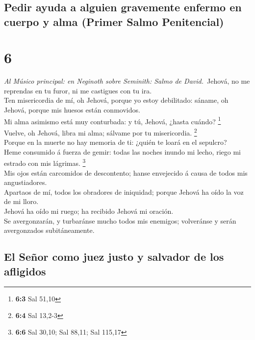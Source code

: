 \hypertarget{pedir-ayuda-a-alguien-gravemente-enfermo-en-cuerpo-y-alma-primer-salmo-penitencial}{%
\subsection{Pedir ayuda a alguien gravemente enfermo en cuerpo y alma
(Primer Salmo
Penitencial)}\label{pedir-ayuda-a-alguien-gravemente-enfermo-en-cuerpo-y-alma-primer-salmo-penitencial}}

\hypertarget{section-5}{%
\section{6}\label{section-5}}

 \emph{Al Músico principal: en Neginoth sobre Seminith:
Salmo de David.}~Jehová, no me reprendas en tu furor, ni me castigues
con tu ira.\\
 Ten misericordia de mí, oh Jehová, porque yo estoy
debilitado: sáname, oh Jehová, porque mis huesos están conmovidos.\\
 Mi alma asimismo está muy conturbada: y tú, Jehová, ¿hasta
cuándo? \footnote{\textbf{6:3} Sal 51,10}\\
 Vuelve, oh Jehová, libra mi alma; sálvame por tu
misericordia. \footnote{\textbf{6:4} Sal 13,2-3}\\
 Porque en la muerte no hay memoria de ti: ¿quién te loará
en el sepulcro?\\
 Heme consumido á fuerza de gemir: todas las noches inundo
mi lecho, riego mi estrado con mis lágrimas. \footnote{\textbf{6:6} Sal
  30,10; Sal 88,11; Sal 115,17}\\
 Mis ojos están carcomidos de descontento; hanse envejecido
á causa de todos mis angustiadores.\\
 Apartaos de mí, todos los obradores de iniquidad; porque
Jehová ha oído la voz de mi lloro.\\
 Jehová ha oído mi ruego; ha recibido Jehová mi oración.\\
 Se avergonzarán, y turbaránse mucho todos mis enemigos;
volveránse y serán avergonzados subitáneamente.

\hypertarget{el-seuxf1or-como-juez-justo-y-salvador-de-los-afligidos}{%
\subsection{El Señor como juez justo y salvador de los
afligidos}\label{el-seuxf1or-como-juez-justo-y-salvador-de-los-afligidos}}

